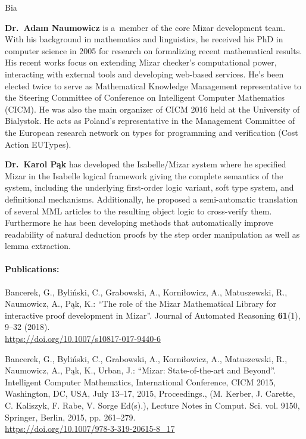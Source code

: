\begin{sitedescription}{Bia}
\begin{compactitem}
\item\textbf{Dr.\ Adam Naumowicz} is a~member of the core Mizar development team. 
With his background in mathematics and linguistics, he received his PhD in computer science in 2005
for research on formalizing recent mathematical results. His recent works focus on extending Mizar checker's computational power, 
interacting with external tools and developing web-based services. 
He's been elected twice to serve as Mathematical Knowledge Management representative to the Steering Committee
of Conference on Intelligent Computer Mathematics (CICM).
He was also the main organizer of CICM 2016 held at the University of Bialystok. 
He acts as Poland's representative in the Management Committee of the European research network on types
 for programming and verification (Cost Action EUTypes).

\item\textbf{Dr.\ Karol Pąk} has developed the Isabelle/Mizar system where
he specified Mizar in the Isabelle logical framework
giving the complete semantics of the system, including
the underlying first-order logic variant, soft type system, and definitional mechanisms.
Additionally, he proposed a semi-automatic translation of several MML articles
to the resulting object logic to cross-verify them.
Furthermore he has been developing methods
that automatically improve readability of natural deduction proofs
by the step order manipulation as well as lemma extraction.

\end{compactitem}

\paragraph{Publications:}

\begin{compactitem}

\item Bancerek, G., Byliński, C., Grabowski, A., Korniłowicz, A., Matuszewski, R., Naumowicz, A., Pąk, K.:
``The role of the {M}izar {M}athematical {L}ibrary for interactive proof development in {M}izar''.
Journal of Automated Reasoning \textbf{61}(1), 9--32 (2018).
\\\url{https://doi.org/10.1007/s10817-017-9440-6}

\item Bancerek, G., Byliński, C., Grabowski, A., Korniłowicz, A., Matuszewski, R., Naumowicz, A., Pąk, K., Urban, J.:
``Mizar: State-of-the-art and Beyond''.
Intelligent Computer Mathematics, International Conference, CICM 2015, Washington, DC, USA, 
July 13--17, 2015, Proceedings., (M. Kerber, J. Carette, C. Kaliszyk, F. Rabe, V. Sorge Ed(s).), 
Lecture Notes in Comput. Sci. vol. 9150, Springer, Berlin, 2015, pp. 261--279.
\\\url{https://doi.org/10.1007/978-3-319-20615-8_17}


\end{compactitem}
\end{sitedescription}

